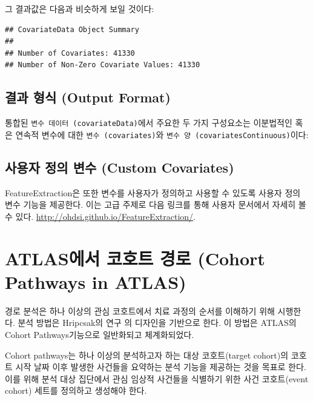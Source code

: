 \documentclass[11pt]{book}
\newenvironment{Shaded}{\begin{snugshade}}{\end{snugshade}}
\newcommand{\OperatorTok}[1]{\textcolor[rgb]{0.81,0.36,0.00}{\textbf{#1}}}
\newcommand{\NormalTok}[1]{#1}
\theoremstyle{definition}
\theoremstyle{definition}
\theoremstyle{definition}
\theoremstyle{remark}
\begin{document}
그 결과값은 다음과 비슷하게 보일 것이다:

\begin{verbatim}
## CovariateData Object Summary 
## 
## Number of Covariates: 41330 
## Number of Non-Zero Covariate Values: 41330
\end{verbatim}

\subsection{결과 형식 (Output Format)}\label{--output-format}

통합된 \texttt{변수\ 데이터\ (covariateData)}에서 주요한 두 가지
구성요소는 이분법적인 혹은 연속적 변수에 대한
\texttt{변수\ (covariates)}와
\texttt{변수\ 양\ (covariatesContinuous)}이다:

\begin{Shaded}
\end{Shaded}

\subsection{사용자 정의 변수 (Custom
Covariates)}\label{---custom-covariates}

FeatureExtraction은 또한 변수를 사용자가 정의하고 사용할 수 있도록
사용자 정의 변수 기능을 제공한다. 이는 고급 주제로 다음 링크를 통해
사용자 문서에서 자세히 볼 수 있다.
\url{http://ohdsi.github.io/FeatureExtraction/}.

\section{ATLAS에서 코호트 경로 (Cohort Pathways in
ATLAS)}\label{atlas---cohort-pathways-in-atlas}

경로 분석은 하나 이상의 관심 코호트에서 치료 과정의 순서를 이해하기 위해
시행한다. 분석 방법은 Hripcsak의 연구 \citep{Hripcsak7329} 의 디자인을
기반으로 한다. 이 방법은 ATLAS의 Cohort Pathways기능으로 일반화되고
체계화되었다.

Cohort pathways는 하나 이상의 분석하고자 하는 대상 코호트(target
cohort)의 코호트 시작 날짜 이후 발생한 사건들을 요약하는 분석 기능을
제공하는 것을 목표로 한다. 이를 위해 분석 대상 집단에서 관심 임상적
사건들을 식별하기 위한 사건 코호트(event cohort) 세트를 정의하고
생성해야 한다.
\end{document}
